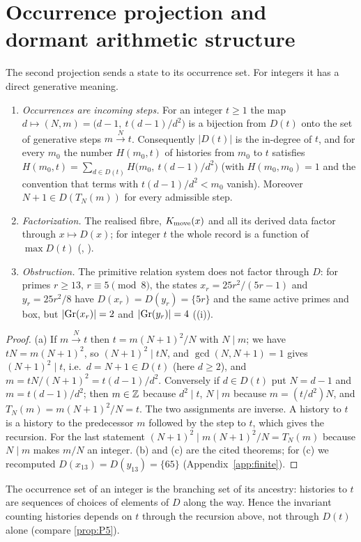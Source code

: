 \section{Occurrence projection and dormant arithmetic structure}\label{sec:occurrence}
The second projection sends a state to its occurrence set. For integers it has a direct generative meaning.

\begin{proposition}\label{prop:P2}
\begin{enumerate}[label=(\alph*),itemsep=1pt]
\item \emph{Occurrences are incoming steps.} For an integer $t\ge1$ the map $d\mapsto(N,m)=\bigl(d-1,\ t(d-1)/d^2\bigr)$ is a bijection from $D(t)$ onto the set of generative steps $m\xrightarrow{N}t$. Consequently $|D(t)|$ is the in-degree of $t$, and for every $m_0$ the number $H(m_0,t)$ of histories from $m_0$ to $t$ satisfies $H(m_0,t)=\sum_{d\in D(t)}H\bigl(m_0,\ t(d-1)/d^2\bigr)$ (with $H(m_0,m_0)=1$ and the convention that terms with $t(d-1)/d^2<m_0$ vanish). Moreover $N+1\in D(T_N(m))$ for every admissible step.
\item \emph{Factorization.} The realised fibre, $K_{\mathrm{move}}(x)$ and all its derived data factor through $x\mapsto D(x)$; for integer $t$ the whole record is a function of $\max D(t)$ (, ).
\item \emph{Obstruction.} The primitive relation system does not factor through $D$: for primes $r\ge13$, $r\equiv5\pmod8$, the states $x_r=25r^2/(5r-1)$ and $y_r=25r^2/8$ have $D(x_r)=D(y_r)=\{5r\}$ and the same active primes and box, but $|\mathrm{Gr}(x_r)|=2$ and $|\mathrm{Gr}(y_r)|=4$ ((i)).
\end{enumerate}
\end{proposition}
\begin{proof}
(a) If $m\xrightarrow{N}t$ then $t=m(N+1)^2/N$ with $N\mid m$; we have $tN=m(N+1)^2$, so $(N+1)^2\mid tN$, and $\gcd(N,N+1)=1$ gives $(N+1)^2\mid t$, i.e.\ $d=N+1\in D(t)$ (here $d\ge2$), and $m=tN/(N+1)^2=t(d-1)/d^2$. Conversely if $d\in D(t)$ put $N=d-1$ and $m=t(d-1)/d^2$; then $m\in\mathbb Z$ because $d^2\mid t$, $N\mid m$ because $m=(t/d^2)N$, and $T_N(m)=m(N+1)^2/N=t$. The two assignments are inverse. A history to $t$ is a history to the predecessor $m$ followed by the step to $t$, which gives the recursion. For the last statement $(N+1)^2\mid m(N+1)^2/N=T_N(m)$ because $N\mid m$ makes $m/N$ an integer.
(b) and (c) are the cited theorems; for (c) we recomputed $D(x_{13})=D(y_{13})=\{65\}$ (Appendix~\ref{app:finite}).
\end{proof}
\begin{corollary}\label{cor:P2}
The occurrence set of an integer is the branching set of its ancestry: histories to $t$ are sequences of choices of elements of $D$ along the way. Hence the invariant counting histories depends on $t$ through the recursion above, not through $D(t)$ alone (compare \cref{prop:P5}).
\end{corollary}
